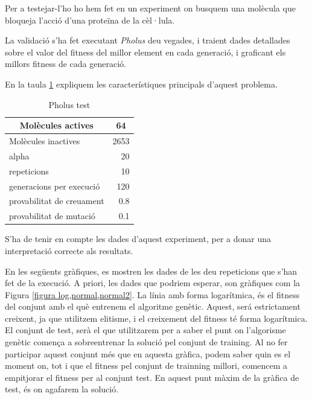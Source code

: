 \documentclass[titlepage,a4paper,12pt]{book}
\begin{document}
Per a testejar-l'ho ho hem fet en un experiment on busquem una molècula que
bloqueja l'acció d'una proteïna de la cèl·lula.

La validació s'ha fet executant \emph{Pholus} deu vegades, i traient
dades detallades sobre el valor del fitness del millor element en cada
generació, i graficant els millors fitness de cada generació.

En la taula \ref{qrpholustest} expliquem les característiques principals d'aquest problema.


\begin{table}
\centering
\begin{tabular}{|l|r|}
\hline
\multicolumn{1}{|c|}{\textbf{Molècules actives }} & \multicolumn{1}{c|}{\textbf{ 64}} \\
\hline
\hline
Molècules inactives      & 2653 \\
alpha                     & 20   \\
repeticions               & 10   \\
generacions per execució & 120  \\
provabilitat de creuament & 0.8  \\
provabilitat de mutació  & 0.1  \\
\hline
\end{tabular}
\caption{Pholus test} \label{qrpholustest}
\end{table}

S'ha de tenir en compte les dades d'aquest experiment, per a donar una
interpretació correcte als resultats.

En les següents gràfiques, es mostren les dades de les deu repeticions que s'han
fet de la execució.  A priori, les dades que podriem esperar, son gràfiques com
la Figura \ref{figura log,normal,normal2}.  La línia amb forma logarítmica, és
el fitness del conjunt amb el què entrenem el algoritme genètic.  Aquest, será
estrictament creixent, ja que utilitzem elitisme, i el creixement del fitness té
forma logarítmica.  El conjunt de test, serà el que utilitzarem per a saber el
punt on l'algorisme genètic comença a sobreentrenar la solució pel conjunt de
training.  Al no fer participar aquest conjunt més que en aquesta gràfica, podem
saber quin es el moment on, tot i que el fitness pel conjunt de trainning millori,
comencem a empitjorar el fitness per al conjunt test.  En aquest punt màxim de
la gràfica de test, és on agafarem la solució.
\end{document}
